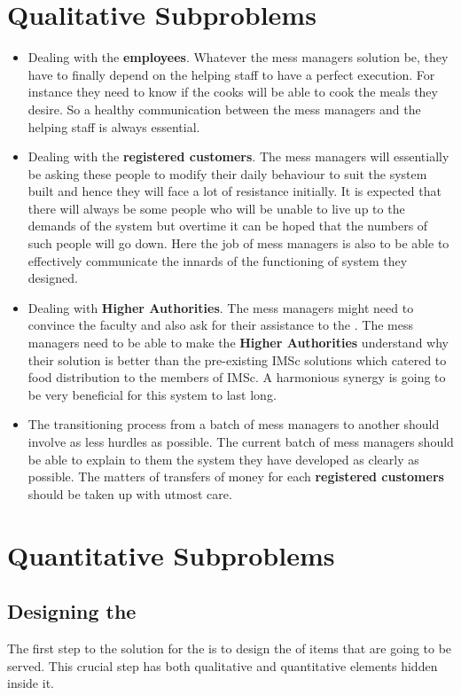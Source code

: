 \documentclass[12pt]{report}
\newcommand{\MP}{ \color{red}{\textbf{ Mess Problem}}}
\newcommand{\menu}{\color{red}{\textbf{ Menu}}}
\newcommand{\RC}{\textbf{registered customers}}
\begin{document}
\section{Qualitative Subproblems}
\begin{itemize}
\item Dealing with the \textbf{employees}. Whatever the mess managers solution be, they have to finally depend on the helping staff to have a perfect execution. For instance they need to know if the cooks will be able to cook the meals they desire. So a healthy communication between the mess managers and the helping staff is always essential. 
\item Dealing with the {\RC}. The mess managers will essentially be asking these people to modify their daily behaviour to suit the system built and hence they will face a lot of resistance initially. It is expected that there will always be some people who will be unable to live up to the demands of the system but overtime it can be hoped that the numbers of such people will go down. Here the job of mess managers is also to be able to effectively communicate the innards of the functioning of system they designed. 
\item Dealing with \textbf{Higher Authorities}. The mess managers might need to convince the faculty and also ask for their assistance to the {\MP}. The mess managers need to be able to make the \textbf{Higher Authorities} understand why their solution is better than the pre-existing IMSc solutions which catered to food distribution to the members of IMSc. A harmonious synergy is going to be very beneficial for this system to last long.
\item The transitioning process from a batch of mess managers to another should involve as less hurdles as possible. The current batch of mess managers should be able to explain to them the system they have developed as clearly as possible. The matters of transfers of money for each {\RC} should be taken up with utmost care.

\end{itemize}

\section{Quantitative Subproblems}
\subsection{Designing the {\menu} }
The first step to the solution for the {\MP} is to design the {\menu} of items that are going to be served. This crucial step has both qualitative and quantitative elements hidden inside it. 
\end{document}
